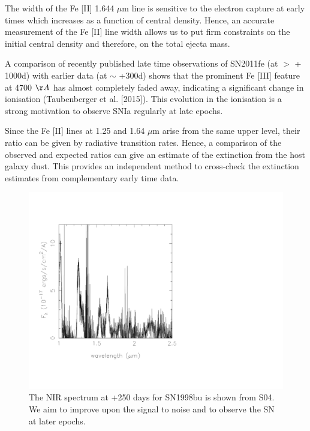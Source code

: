 \documentclass[11pt]{article}
\begin{document}
The width of the Fe [II] 1.644 $\mu$m line is sensitive to the electron capture at early times which increases as a function of central density. Hence, an accurate measurement of the Fe [II] line width allows us to put firm constraints on the initial central density and therefore, on the total ejecta mass. 

A comparison of recently published late time observations of SN2011fe (at $>$ + 1000d) with earlier data (at $\sim$ +300d) shows that the prominent Fe [III] feature at 4700 $\AA$ has almost completely faded away, indicating a significant change in ionisation (Taubenberger et al. [2015]). This evolution in the ionisation is a strong motivation to observe SNIa regularly at late epochs.  

Since the Fe [II] lines at 1.25 and 1.64 $\mu$m arise from the same upper level, their ratio can be given by radiative transition rates. Hence, a comparison of the observed and expected ratios can give an estimate of the extinction from the host galaxy dust. This provides an independent method to cross-check the extinction estimates from complementary early time data. 

\begin{figure}
\includegraphics[width=.8\textwidth]{../0570fig1.pdf}
\caption{The NIR spectrum at +250 days for SN1998bu is shown from S04. We aim to improve upon the signal to noise and to observe the SN at later epochs. }%
\end{figure}

\end{document}
